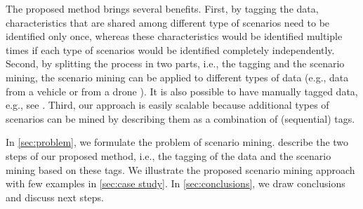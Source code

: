 \cstarta The proposed method brings several benefits. 
First, by tagging the data, characteristics that are shared among different type of scenarios need to be identified only once, whereas these characteristics would be identified multiple times if each type of scenarios would be identified completely independently.
Second, by splitting the process in two parts, i.e., the tagging and the scenario mining, the scenario mining can be applied to different types of data (e.g., data from a vehicle \autocite{paardekooper2019dataset6000km} or from a drone \autocite{krajewski2018highD}). 
It is also possible to have manually tagged data, e.g., see \autocite{fontana2018action}. 
Third, our approach is easily scalable because additional types of scenarios can be mined by  describing them as a combination of (sequential) tags.

In \cref{sec:problem}, we formulate the problem of scenario mining.  describe the two steps of our proposed method, i.e., the tagging of the data and the scenario mining based on these tags. 
We illustrate the proposed scenario mining approach with few examples in \cref{sec:case study}. 
In \cref{sec:conclusions}, we draw conclusions and discuss next steps.

\cenda
